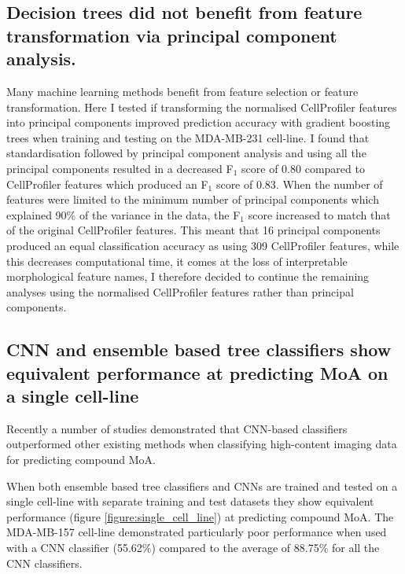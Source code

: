 \documentclass[a4paper,11pt,twoside,openright]{scrbook}
\begin{document}
\subsection{Decision trees did not benefit from feature transformation via principal component analysis.}

Many machine learning methods benefit from feature selection or feature transformation.
Here I tested if transforming the normalised CellProfiler features into principal components improved prediction 
accuracy with gradient boosting trees when training and testing on the MDA-MB-231 cell-line.
I found that standardisation followed by principal component analysis and using all the principal components resulted 
in a decreased F$_1$ score of 0.80 compared to CellProfiler features which produced an F$_1$ score of 0.83.
When the number of features were limited to the minimum number of principal components which explained 90\% of the 
variance in the data, the F$_1$ score increased to match that of the original CellProfiler features.
This meant that 16 principal components produced an equal classification accuracy as using 309 CellProfiler features, 
while this decreases computational time, it comes at the loss of interpretable morphological feature names, I therefore 
decided to continue the remaining analyses using the normalised CellProfiler features rather than principal components.


\subsection{CNN and ensemble based tree classifiers show equivalent performance at predicting MoA on a single cell-line}

Recently a number of studies demonstrated that CNN-based classifiers outperformed other existing methods when 
classifying high-content imaging data for predicting compound MoA.

When both ensemble based tree classifiers and CNNs are trained and tested on a single cell-line with separate training 
and test datasets they show equivalent performance (figure \ref{figure:single_cell_line}) at predicting compound MoA.
The MDA-MB-157 cell-line demonstrated particularly poor performance when used with a CNN classifier (55.62\%) compared 
to the average of 88.75\% for all the CNN classifiers.
\end{document}
